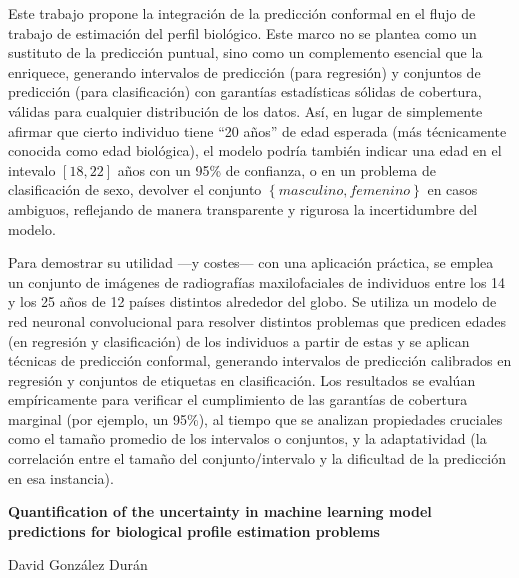 Este trabajo propone la integración de la predicción conformal en el flujo de trabajo de estimación del perfil biológico. Este marco no se plantea como un sustituto de la predicción puntual, sino como un complemento esencial que la enriquece, generando intervalos de predicción (para regresión) y conjuntos de predicción (para clasificación) con garantías estadísticas sólidas de cobertura, válidas para cualquier distribución de los datos. Así, en lugar de simplemente afirmar que cierto individuo tiene ``20 años'' de edad esperada (más técnicamente conocida como edad biológica), el modelo podría también indicar una edad en el intevalo $[18, 22]$ años con un 95\% de confianza, o en un problema de clasificación de sexo, devolver el conjunto $\left\{masculino, femenino\right\}$ en casos ambiguos, reflejando de manera transparente y rigurosa la incertidumbre del modelo.

Para demostrar su utilidad ---y costes--- con una aplicación práctica, se emplea un conjunto de imágenes de radiografías maxilofaciales de individuos entre los 14 y los 25 años de 12 países distintos alrededor del globo. Se utiliza un modelo de red neuronal convolucional para resolver distintos problemas que predicen edades (en regresión y clasificación) de los individuos a partir de estas y se aplican técnicas de predicción conformal, generando intervalos de predicción calibrados en regresión y conjuntos de etiquetas en clasificación. Los resultados se evalúan empíricamente para verificar el cumplimiento de las garantías de cobertura marginal (por ejemplo, un 95\%), al tiempo que se analizan propiedades cruciales como el tamaño promedio de los intervalos o conjuntos, y la adaptatividad (la correlación entre el tamaño del conjunto/intervalo y la dificultad de la predicción en esa instancia). 


\cleardoublepage
\thispagestyle{empty}

\begin{center}
    {\large\bfseries Quantification of the uncertainty in machine learning model predictions for biological profile estimation problems}
\end{center}
\begin{center}
    David González Durán 
\end{center}

\vspace{0.7cm}

